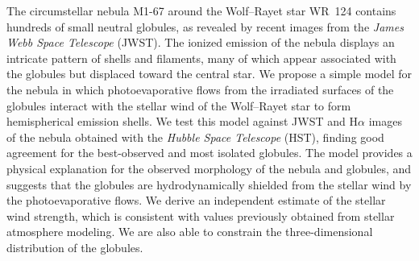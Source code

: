 \documentclass{book}
\begin{document}
The circumstellar nebula M1-67 around the Wolf–Rayet star WR~124 contains hundreds of small neutral globules, as revealed by recent images from the \textit{James Webb Space Telescope} (JWST). The ionized emission of the nebula displays an intricate pattern of shells and filaments, many of which appear associated with the globules but displaced toward the central star.  We propose a simple model for the nebula in which photoevaporative flows from the irradiated surfaces of the globules interact with the stellar wind of the Wolf–Rayet star to form hemispherical emission shells. We test this model against JWST and H$\alpha$ images of the nebula obtained with the \textit{Hubble Space Telescope} (HST), finding good agreement for the best-observed and most isolated globules.  The model provides a physical explanation for the observed morphology of the nebula and globules, and suggests that the globules are hydrodynamically shielded from the stellar wind by the photoevaporative flows. We derive an independent estimate of the stellar wind strength, which is consistent with values previously obtained from stellar atmosphere modeling. We are also able to constrain the three-dimensional distribution of the globules.



\end{document}
